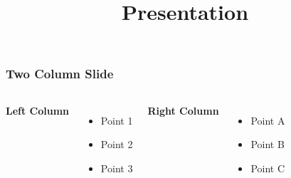 \documentclass{beamer}
\title{Presentation}
\begin{document}
\begin{frame}
\frametitle{Two Column Slide}
\begin{columns}[T]
\textbf{Left Column}
\begin{itemize}
\item Point 1
\item Point 2
\item Point 3
\end{itemize}

\textbf{Right Column}
\begin{itemize}
\item Point A
\item Point B
\item Point C
\end{itemize}
\end{columns}
\end{frame}
\end{document}
